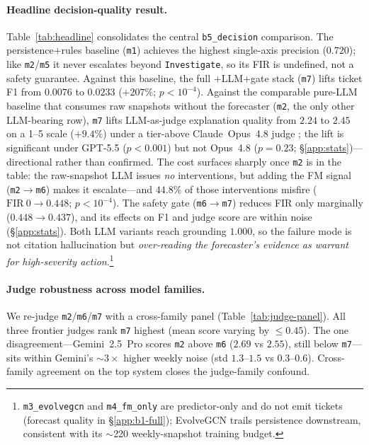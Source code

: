 \paragraph{Headline decision-quality result.}
Table~\ref{tab:headline} consolidates the central
\texttt{b5\_decision} comparison. The persistence$+$rules baseline
(\texttt{m1}) achieves the highest single-axis precision
($0.720$); like \texttt{m2}/\texttt{m5} it never escalates beyond
\texttt{Investigate}, so its FIR is undefined, not a safety
guarantee. Against this baseline, the full
\fmname$+$LLM$+$gate stack (\texttt{m7}) lifts ticket F1 from
$0.0076$ to $0.0233$ ($+207\%$; $p\!<\!10^{-4}$). Against the comparable pure-LLM
baseline that consumes raw snapshots without the forecaster
(\texttt{m2}, the only other LLM-bearing row), \texttt{m7} lifts
LLM-as-judge explanation quality from $2.24$ to $2.45$ on a 1--5
scale ($+9.4\%$) under a tier-above Claude~Opus~4.8 judge
\citep{Zheng2023LLMJudge}; the lift is significant under GPT-5.5
($p\!<\!0.001$) but not Opus~4.8 ($p\!=\!0.23$;
\S\ref{app:stats})---directional rather than confirmed. The
cost surfaces sharply once \texttt{m2} is in the table: the
raw-snapshot LLM issues \emph{no} interventions, but adding the FM
signal (\texttt{m2}$\!\to\!$\texttt{m6}) makes it escalate---and
$44.8\%$ of those interventions misfire
($\mathrm{FIR}~0\!\to\!0.448$; $p\!<\!10^{-4}$). The safety gate
(\texttt{m6}$\!\to\!$\texttt{m7}) reduces FIR only marginally
($0.448\!\to\!0.437$), and its effects on F1 and judge score are
within noise (\S\ref{app:stats}). Both LLM variants
reach grounding $1.000$, so the failure mode is not citation
hallucination but \emph{over-reading the forecaster's evidence as
warrant for high-severity action}.\footnote{\texttt{m3\_evolvegcn}
and \texttt{m4\_fm\_only} are predictor-only and do not emit
tickets (forecast quality in \S\ref{app:b1-full}); EvolveGCN
trails persistence downstream, consistent with its $\sim$220
weekly-snapshot training budget.}

\paragraph{Judge robustness across model families.}
We re-judge \texttt{m2}/\texttt{m6}/\texttt{m7} with a
cross-family panel (Table~\ref{tab:judge-panel}). All three
frontier judges rank \texttt{m7} highest (mean score varying by
$\leq\!0.45$). The one disagreement---Gemini~2.5~Pro scores
\texttt{m2} above \texttt{m6} ($2.69$ vs $2.55$), still below
\texttt{m7}---sits within Gemini's ${\sim}3\times$ higher weekly
noise (std $1.3$--$1.5$ vs $0.3$--$0.6$). Cross-family agreement
on the top system closes the judge-family confound.

